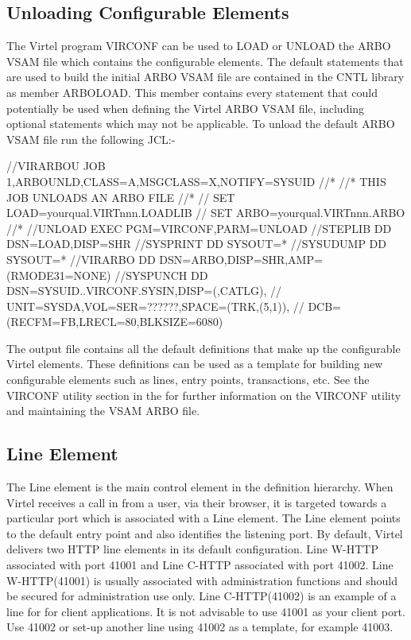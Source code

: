 \documentclass[letterpaper,10pt,english]{sphinxmanual}
\begin{document}
\subsection{Unloading Configurable Elements}
\label{\detokenize{connectivity_guide:unloading-configurable-elements}}
The Virtel program VIRCONF can be used to LOAD or UNLOAD the ARBO VSAM file which contains the configurable elements. The default statements that are used to build the initial ARBO VSAM file are contained in the CNTL library as member ARBOLOAD. This member contains every statement that could potentially be used when defining the Virtel ARBO VSAM file, including optional statements which may not be applicable. To unload the default ARBO VSAM file run the following JCL:-

\begin{sphinxVerbatim}[commandchars=\\\{\}]
//VIRARBOU JOB 1,ARBOUNLD,CLASS=A,MSGCLASS=X,NOTIFY=\PYGZam{}SYSUID
//*
//* THIS JOB UNLOADS AN ARBO FILE
//*
// SET LOAD=yourqual.VIRTnnn.LOADLIB
// SET ARBO=yourqual.VIRTnnn.ARBO
//*
//UNLOAD  EXEC PGM=VIRCONF,PARM=UNLOAD
//STEPLIB  DD  DSN=\PYGZam{}LOAD,DISP=SHR
//SYSPRINT DD  SYSOUT=*
//SYSUDUMP DD  SYSOUT=*
//VIRARBO  DD  DSN=\PYGZam{}ARBO,DISP=SHR,AMP=(\PYGZsq{}RMODE31=NONE\PYGZsq{})
//SYSPUNCH DD  DSN=\PYGZam{}SYSUID..VIRCONF.SYSIN,DISP=(,CATLG),
//             UNIT=SYSDA,VOL=SER=??????,SPACE=(TRK,(5,1)),
//             DCB=(RECFM=FB,LRECL=80,BLKSIZE=6080)
\end{sphinxVerbatim}


The output file contains all the default definitions that make up the configurable Virtel elements. These definitions can be used as a template for building new configurable elements such as lines, entry points, transactions, etc. See the VIRCONF utility section in the  for further information on the VIRCONF utility and maintaining the VSAM ARBO file.

\newpage


\subsection{Line Element}
\label{\detokenize{connectivity_guide:line-element}}
The Line element is the main control element in the definition hierarchy. When Virtel receives a call in from a user, via their browser, it is targeted towards a particular port which is associated with a Line element.  The Line element points to the default entry point and also identifies the listening port. By default, Virtel delivers two HTTP line elements in its default configuration. Line W-HTTP associated with port 41001 and Line C-HTTP associated with port 41002. Line W-HTTP(41001) is usually associated with administration functions and should be secured for administration use only. Line C-HTTP(41002) is an example of a line for for client applications. It is not advisable to use 41001 as your client port. Use 41002 or set-up another line using 41002 as a template, for example 41003.
\end{document}
